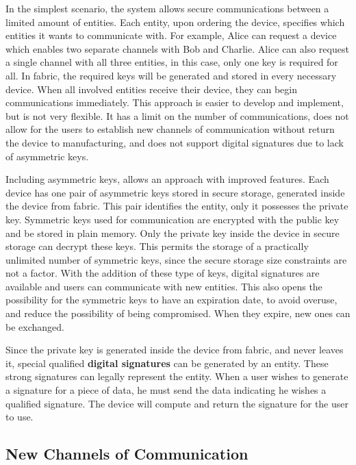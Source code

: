 In the simplest scenario, the system allows secure communications between a limited amount of entities. Each entity, upon ordering the device, specifies which entities it wants to communicate with. For example, Alice can request a device which enables two separate channels with Bob and Charlie. Alice can also request a single channel with all three entities, in this case, only one key is required for all.
In fabric, the required keys will be generated and stored in every necessary device. When all involved entities receive their device, they can begin communications immediately.
This approach is easier to develop and implement, but is not very flexible. It has a limit on the number of communications, does not allow for the users to establish new channels of communication without return the device to manufacturing, and does not support digital signatures due to lack of asymmetric keys.

Including asymmetric keys, allows an approach with improved features.
Each device has one pair of asymmetric keys stored in secure storage, generated inside the device from fabric. This pair identifies the entity, only it possesses the private key. Symmetric keys used for communication are encrypted with the public key and be stored in plain memory. Only the private key inside the device in secure storage can decrypt these keys. This permits the storage of a practically unlimited number of symmetric keys, since the secure storage size constraints are not a factor.
With the addition of these type of keys, digital signatures are available and users can communicate with new entities. This also opens the possibility for the symmetric keys to have an expiration date, to avoid overuse, and reduce the possibility of being compromised. When they expire, new ones can be exchanged.

Since the private key is generated inside the device from fabric, and never leaves it, special qualified \textbf{digital signatures} can be generated by an entity. These strong signatures can legally represent the entity. When a user wishes to generate a signature for a piece of data, he must send the data indicating he wishes a qualified signature. The device will compute and return the signature for the user to use.

\subsection{New Channels of Communication}\label{chap:problem:scenarios:keys}

